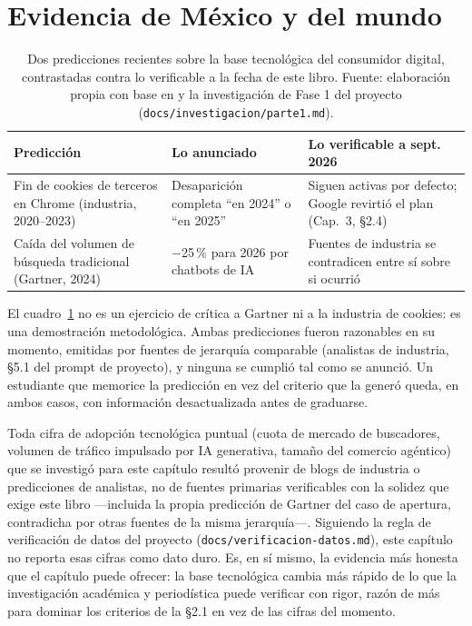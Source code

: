 \section{Evidencia de México y del mundo}

\begin{table}[htbp]
\centering
\begin{tabular}{@{}p{3.3cm}p{4.6cm}p{4.1cm}@{}}
\toprule
Predicción & Lo anunciado & Lo verificable a sept. 2026 \\
\midrule
Fin de cookies de terceros en Chrome (industria, 2020--2023) & Desaparición completa \enquote{en 2024} o \enquote{en 2025} & Siguen activas por defecto; Google revirtió el plan (Cap.~3, §2.4) \\
Caída del volumen de búsqueda tradicional (Gartner, 2024) & $-$25\,\% para 2026 por chatbots de IA & Fuentes de industria se contradicen entre sí sobre si ocurrió \\
\bottomrule
\end{tabular}
\caption{Dos predicciones recientes sobre la base tecnológica del
consumidor digital, contrastadas contra lo verificable a la fecha de este
libro. Fuente: elaboración propia con base en
\parencite{eprs2025darkpatterns} y la investigación de Fase 1 del proyecto
(\texttt{docs/investigacion/parte1.md}).}
\label{tab:cap04-predicciones}
\end{table}

El cuadro~\ref{tab:cap04-predicciones} no es un ejercicio de crítica a
Gartner ni a la industria de cookies: es una demostración metodológica. Ambas
predicciones fueron razonables en su momento, emitidas por fuentes de
jerarquía comparable (analistas de industria, §5.1 del prompt de proyecto), y
ninguna se cumplió tal como se anunció. Un estudiante que memorice la
predicción en vez del criterio que la generó queda, en ambos casos, con
información desactualizada antes de graduarse.

Toda cifra de adopción tecnológica puntual (cuota de mercado de buscadores,
volumen de tráfico impulsado por IA generativa, tamaño del comercio
agéntico) que se investigó para este capítulo resultó provenir de blogs de
industria o predicciones de analistas, no de fuentes primarias verificables
con la solidez que exige este libro —incluida la propia predicción de
Gartner del caso de apertura, contradicha por otras fuentes de la misma
jerarquía—. Siguiendo la regla de verificación de datos del proyecto
(\texttt{docs/verificacion-datos.md}), este capítulo no reporta esas cifras
como dato duro. Es, en sí mismo, la evidencia más honesta que el capítulo
puede ofrecer: la base tecnológica cambia más rápido de lo que la
investigación académica y periodística puede verificar con rigor, razón de
más para dominar los criterios de la §2.1 en vez de las cifras del momento.

